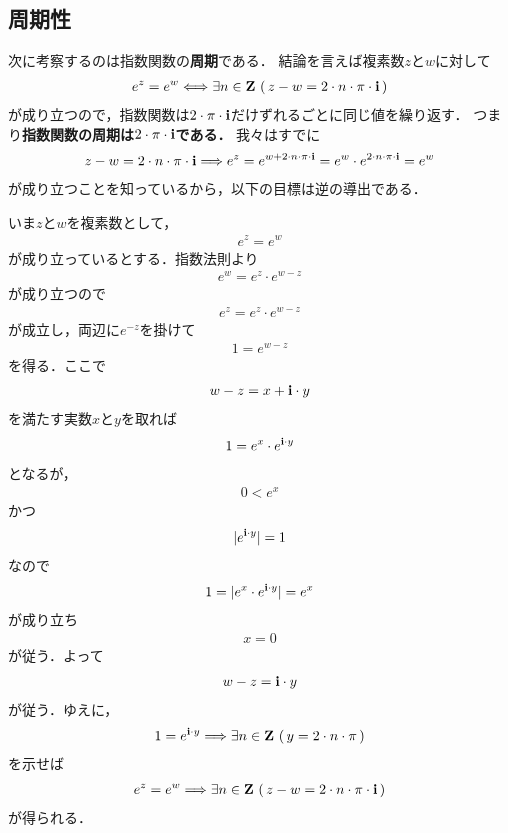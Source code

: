 \subsection{周期性}
	次に考察するのは指数関数の{\bf 周期}である．
	結論を言えば複素数$z$と$w$に対して
	\begin{align}
		e^{z} = e^{w} \Longleftrightarrow 
		\exists n \in \mathbf{Z}\, \left(\, z - w = 2 \cdot n \cdot \pi \cdot \mathbf{i}\, \right)
	\end{align}
	が成り立つので，指数関数は$2 \cdot \pi \cdot \mathbf{i}$だけずれるごとに同じ値を繰り返す．
	つまり{\bf 指数関数の周期は$2 \cdot \pi \cdot \mathbf{i}$である．}
	我々はすでに
	\begin{align}
		z - w = 2 \cdot n \cdot \pi \cdot \mathbf{i}
		\Longrightarrow e^{z} = e^{w + 2 \cdot n \cdot \pi \cdot \mathbf{i}}
		= e^{w} \cdot e^{2 \cdot n \cdot \pi \cdot \mathbf{i}}
		= e^{w}
	\end{align}
	が成り立つことを知っているから，以下の目標は逆の導出である．
	
	いま$z$と$w$を複素数として，
	\begin{align}
		e^{z} = e^{w}
	\end{align}
	が成り立っているとする．指数法則より
	\begin{align}
		e^{w} = e^{z} \cdot e^{w-z}
	\end{align}
	が成り立つので
	\begin{align}
		e^{z} = e^{z} \cdot e^{w-z}
	\end{align}
	が成立し，両辺に$e^{-z}$を掛けて
	\begin{align}
		1 = e^{w-z}
	\end{align}
	を得る．ここで
	\begin{align}
		w - z = x + \mathbf{i} \cdot y
	\end{align}
	を満たす実数$x$と$y$を取れば
	\begin{align}
		1 = e^{x} \cdot e^{\mathbf{i} \cdot y}
	\end{align}
	となるが，
	\begin{align}
		0 < e^{x}
	\end{align}
	かつ
	\begin{align}
		|e^{\mathbf{i} \cdot y}| = 1
	\end{align}
	なので
	\begin{align}
		1 = |e^{x} \cdot e^{\mathbf{i} \cdot y}| = e^{x}
	\end{align}
	が成り立ち
	\begin{align}
		x = 0
	\end{align}
	が従う．よって
	\begin{align}
		w - z = \mathbf{i} \cdot y
	\end{align}
	が従う．ゆえに，
	\begin{align}
		1 = e^{\mathbf{i} \cdot y} \Longrightarrow 
		\exists n \in \mathbf{Z}\, \left(\, y = 2 \cdot n \cdot \pi\, \right)
	\end{align}
	を示せば
	\begin{align}
		e^{z} = e^{w} \Longrightarrow 
		\exists n \in \mathbf{Z}\, \left(\, z - w = 2 \cdot n \cdot \pi \cdot \mathbf{i}\, \right)
	\end{align}
	が得られる．
	
